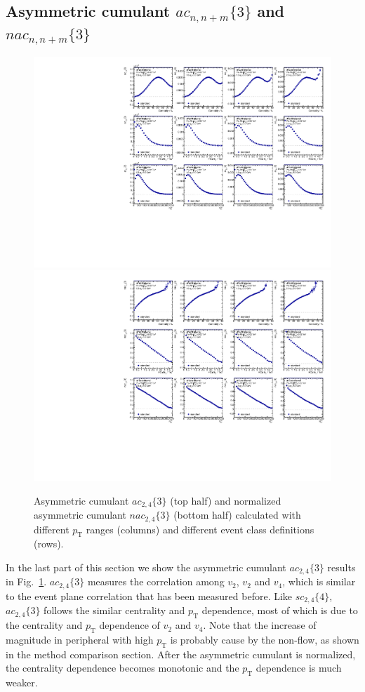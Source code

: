 \subsection{Asymmetric cumulant $ac_{n,n+m}\{3\}$ and $nac_{n,n+m}\{3\}$}
\begin{figure}[H]
\centering
\includegraphics[width=.95\linewidth]{figs/sec_result/forQM/phy_ac_Har2.pdf}
\includegraphics[width=.95\linewidth]{figs/sec_result/forQM/phy_nac_Har2.pdf}
\caption{Asymmetric cumulant $ac_{2,4}\{3\}$ (top half) and normalized asymmetric cumulant $nac_{2,4}\{3\}$ (bottom half) calculated with different $p_\text{T}$ ranges (columns) and different event class definitions (rows).}
\label{fig:result_phy_ac_Har2}
\end{figure}
In the last part of this section we show the asymmetric cumulant $ac_{2,4}\{3\}$ results in Fig.~\ref{fig:result_phy_ac_Har2}. $ac_{2,4}\{3\}$ measures the correlation among $v_2$, $v_2$ and $v_4$, which is similar to the event plane correlation that has been measured before. Like $sc_{2,4}\{4\}$, $ac_{2,4}\{3\}$ follows the similar centrality and $p_\text{T}$ dependence, most of which is due to the centrality and $p_\text{T}$ dependence of $v_2$ and $v_4$. Note that the increase of magnitude in peripheral with high $p_\text{T}$ is probably cause by the non-flow, as shown in the method comparison section. After the asymmetric cumulant is normalized, the centrality dependence becomes monotonic and the $p_\text{T}$ dependence is much weaker.









